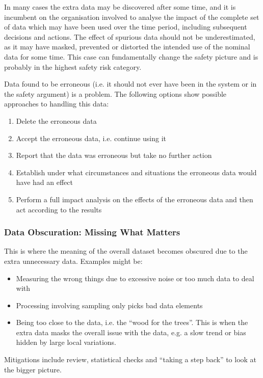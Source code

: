 In many cases the extra data may be discovered after some time, and it is incumbent on the organisation involved to analyse the impact of the complete set of data which may have been used over the time period, including subsequent decisions and actions. The effect of spurious data should not be underestimated, as it may have masked, prevented or distorted the intended use of the nominal data for some time. This case can fundamentally change the safety picture and is probably in the highest safety risk category.

Data found to be erroneous (i.e. it should not ever have been in the system or in the safety argument) is a problem. The following options show possible approaches to handling this data:
\begin{enumerate}[label=\color{dsiwgAccentColour}\roman*)]
    \item Delete the erroneous data
    \item Accept the erroneous data, i.e. continue using it
    \item Report that the data was erroneous but take no further action 
    \item Establish under what circumstances and situations the erroneous data would have had an effect
    \item Perform a full impact analysis on the effects of the erroneous data and then act according to the results
\end{enumerate}

\subsubsection{Data Obscuration: Missing What Matters}
This is where the meaning of the overall \gls{dataset} becomes obscured due to the extra unnecessary data. Examples might be:
\begin{itemize}
    \item Measuring the wrong things due to excessive noise or too much data to deal with
    \item Processing involving sampling only picks bad data elements
    \item Being too close to the data, i.e. the ``wood for the trees''. This is when the extra data masks the overall issue with the data, e.g. a slow trend or bias hidden by large local variations.
\end{itemize}

Mitigations include review, statistical checks and ``taking a step back'' to look at the bigger picture.
